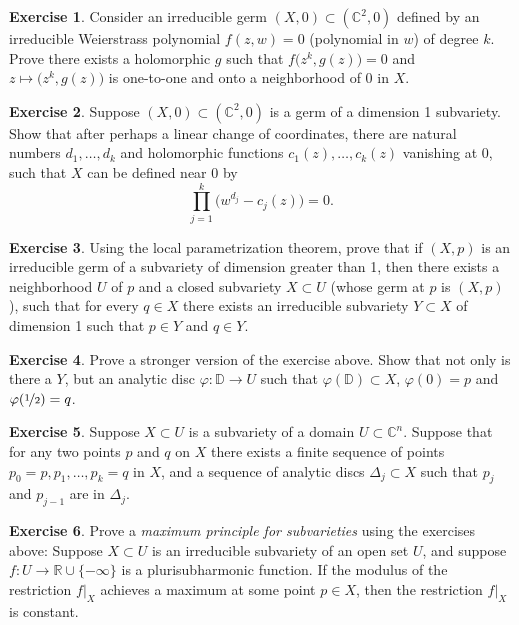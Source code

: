 \documentclass[12pt,openany]{book}
\newcommand{\C}{{\mathbb{C}}}
\newcommand{\R}{{\mathbb{R}}}
\newcommand{\D}{{\mathbb{D}}}
\theoremstyle{plain}
\theoremstyle{remark}
\theoremstyle{definition}
\newenvironment{exbox}{%
    \def\FrameCommand{\vrule width 1pt \relax\hspace{10pt}}%
    \MakeFramed{\advance\hsize-\width\FrameRestore}%
}{%
    \endMakeFramed
}
\theoremstyle{exercise}
\newtheorem{exercise}{Exercise}[section]
\theoremstyle{example}
\begin{document}
\begin{exbox}
\begin{exercise}
Consider an irreducible germ
$(X,0) \subset (\C^2,0)$ defined
by an irreducible Weierstrass polynomial $f(z,w) = 0$ (polynomial in $w$)
of degree $k$.  Prove there exists a holomorphic $g$ such that
$f\bigl(z^k,g(z)\bigr) = 0$ and $z \mapsto \bigl(z^k,g(z)\bigr)$
is one-to-one and onto a neighborhood of 0 in $X$.
\end{exercise}

\begin{exercise}
Suppose $(X,0) \subset (\C^2,0)$ is a germ of a dimension 1 subvariety.
Show that after perhaps a linear change of coordinates,
there are natural numbers
$d_1,\ldots,d_k$
and
holomorphic functions $c_1(z),\ldots,c_k(z)$ vanishing at $0$,
such that $X$ can be defined near 0 by
\begin{equation*}
\prod_{j=1}^k {\bigl( w^{d_j} - c_j(z) \bigr)} = 0.
\end{equation*}
\end{exercise}

\begin{exercise}
Using the local parametrization theorem, prove that
if $(X,p)$ is an irreducible germ of a subvariety of dimension greater
than 1, then there exists a neighborhood $U$ of $p$ and a closed subvariety
$X \subset U$ (whose germ at $p$ is $(X,p)$), such that for every
$q \in X$ there exists an irreducible subvariety $Y \subset X$
of dimension 1 such that $p \in Y$ and $q \in Y$.
\end{exercise}

\begin{exercise}
\pagebreak[2]
Prove a stronger version of the exercise above.  Show that not only is there
a $Y$, but an analytic disc $\varphi \colon \D \to U$ such that
$\varphi(\D) \subset X$, $\varphi(0) = p$ and $\varphi(\nicefrac{1}{2}) =
q$.
\end{exercise}

\begin{exercise}
Suppose $X \subset U$ is a subvariety of a domain $U \subset \C^n$.
Suppose that for any two points $p$ and $q$ on $X$ there exists a finite sequence
of points $p_0 = p, p_1, \ldots, p_k = q$ in $X$, and a sequence of analytic discs
$\Delta_j \subset X$ such that $p_{j}$ and $p_{j-1}$ are in $\Delta_j$.
\end{exercise}

\begin{exercise}\label{exercise:maxprincsubvar}
Prove a \emph{maximum principle for subvarieties} using the exercises above:
Suppose $X \subset U$ is an irreducible subvariety of an open set $U$,
and suppose $f \colon U \to \R \cup \{ - \infty \}$
is a plurisubharmonic function.  If the modulus of the restriction $f|_X$
achieves a maximum
at some point $p \in X$, then the restriction $f|_X$ is constant.
\end{exercise}


\end{exbox}
\end{document}
